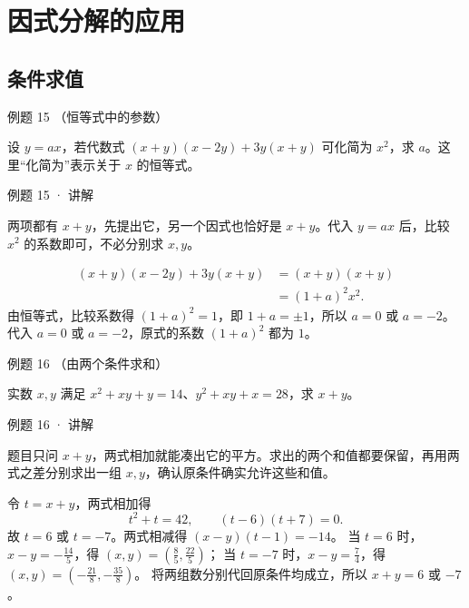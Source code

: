 \section{因式分解的应用}


\subsection{条件求值}



\begin{problem}{例题 15 （恒等式中的参数）}

设 $y=ax$，若代数式 $(x+y)(x-2y)+3y(x+y)$ 可化简为 $x^2$，求 $a$。这里“化简为”表示关于 $x$ 的恒等式。

\end{problem}


\begin{solution}{例题 15 · 讲解}

\think 两项都有 $x+y$，先提出它，另一个因式也恰好是 $x+y$。代入 $y=ax$ 后，比较 $x^2$ 的系数即可，不必分别求 $x,y$。

\solve \begin{align*}
(x+y)(x-2y)+3y(x+y)&=(x+y)(x+y)\\
&=(1+a)^2x^2.
\end{align*}
由恒等式，比较系数得 $(1+a)^2=1$，即 $1+a=\pm1$，所以 $a=0$ 或 $a=-2$。
代入 $a=0$ 或 $a=-2$，原式的系数 $(1+a)^2$ 都为 $1$。


\end{solution}


\begin{problem}{例题 16 （由两个条件求和）}

实数 $x,y$ 满足 $x^2+xy+y=14$、$y^2+xy+x=28$，求 $x+y$。

\end{problem}


\begin{solution}{例题 16 · 讲解}

\think 题目只问 $x+y$，两式相加就能凑出它的平方。求出的两个和值都要保留，再用两式之差分别求出一组 $x,y$，确认原条件确实允许这些和值。

\solve 令 $t=x+y$，两式相加得
\[t^2+t=42,\qquad (t-6)(t+7)=0.\]
故 $t=6$ 或 $t=-7$。两式相减得 $(x-y)(t-1)=-14$。
当 $t=6$ 时，$x-y=-\frac{14}{5}$，得 $(x,y)=(\frac85,\frac{22}5)$；
当 $t=-7$ 时，$x-y=\frac74$，得 $(x,y)=(-\frac{21}8,-\frac{35}8)$。
将两组数分别代回原条件均成立，所以 $x+y=6$ 或 $-7$。


\end{solution}

